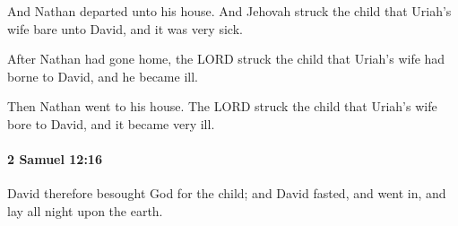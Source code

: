 			\begin{versebox}
					\item[BHS] 
					\item[ASV] And Nathan departed unto his house. And Jehovah struck the child that Uriah's wife bare unto David, and it was very sick.
					\item[NIV] After Nathan had gone home, the LORD struck the child that Uriah’s wife had borne to David, and he became ill.
					\item[NRSV] Then Nathan went to his house. The LORD struck the child that Uriah’s wife bore to David, and it became very ill.
			\end{versebox}

		\paragraph{2 Samuel 12:16} %
			\label{2SAMUEL-12-16}

			David therefore besought God for the child; and David fasted, and went in, and lay all night upon the earth.

